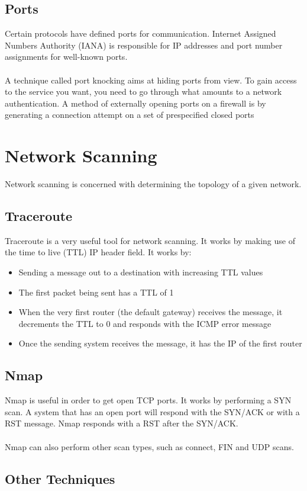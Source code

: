 \documentclass[10pt,a4paper]{report}
\begin{document}
\subsection{Ports}
Certain protocols have defined ports for communication. Internet Assigned Numbers Authority (IANA) is responsible for IP addresses and port number assignments for well-known ports.\\
\\
A technique called port knocking aims at hiding ports from view. To gain access to the service you want, you need to go through what amounts to a network authentication. A method of externally opening ports on a firewall is by generating a connection attempt on a set of prespecified closed ports
\section{Network Scanning}
Network scanning is concerned with determining the topology of a given network.
\subsection{Traceroute}
Traceroute is a very useful tool for network scanning. It works by making use of the time to live (TTL) IP header field. It works by:
\begin{itemize}
\item Sending a message out to a destination with increasing TTL values
\item The first packet being sent has a TTL of 1
\item When the very first router (the default gateway) receives the message, it decrements the TTL to 0 and responds with the ICMP error message
\item Once the sending system receives the message, it has the IP of the first router
\end{itemize}
\subsection{Nmap}
Nmap is useful in order to get open TCP ports. It works by performing a SYN scan. A system that has an open port will respond with the SYN/ACK or with a RST message. Nmap responds with a RST after the SYN/ACK.\\
\\
Nmap can also perform other scan types, such as connect, FIN and UDP scans.
\subsection{Other Techniques}
\end{document}
